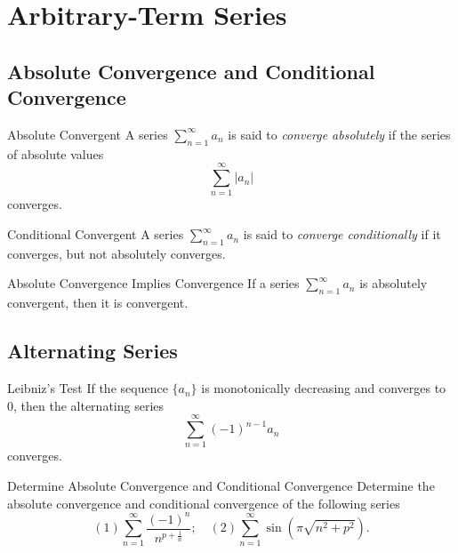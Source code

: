 \section{Arbitrary-Term Series}

\subsection{Absolute Convergence and Conditional Convergence}

\begin{definition}{Absolute Convergent}{}
  A series $\sum\limits_{n = 1}^{\infty}a_n$ is said to \emph{converge absolutely}
  if the series of absolute values
  \begin{equation}
    \sum\limits_{n = 1}^{\infty} |a_n|
  \end{equation}
  converges.
\end{definition}

\begin{definition}{Conditional Convergent}{}
  A series $\sum\limits_{n = 1}^{\infty}a_n$ is said to \emph{converge conditionally}
  if it converges, but not absolutely converges.
\end{definition}

\begin{proposition}{Absolute Convergence Implies Convergence}{}
  If a series $\sum\limits_{n = 1}^{\infty} a_n$ is absolutely convergent,
  then it is convergent.
\end{proposition}

\subsection{Alternating Series}

\begin{theorem}{Leibniz's Test}{}
  If the sequence $\{a_n\}$ is monotonically decreasing and converges to $0$,
  then the alternating series
  \begin{equation}
    \sum\limits_{n = 1}^{\infty}(-1)^{n-1}a_n
  \end{equation}
  converges.
\end{theorem}

\begin{example}{Determine Absolute Convergence and Conditional Convergence}{}
  Determine the absolute convergence and conditional convergence of the
  following series
  \begin{equation}
    (1) \sum\limits_{n = 1}^{\infty} \frac{(-1)^n}{n^{p+\frac{1}{n}}}; \quad
    (2) \sum\limits_{n = 1}^{\infty} \sin (\pi \sqrt{n^2 + p^2}).
  \end{equation}
\end{example}

